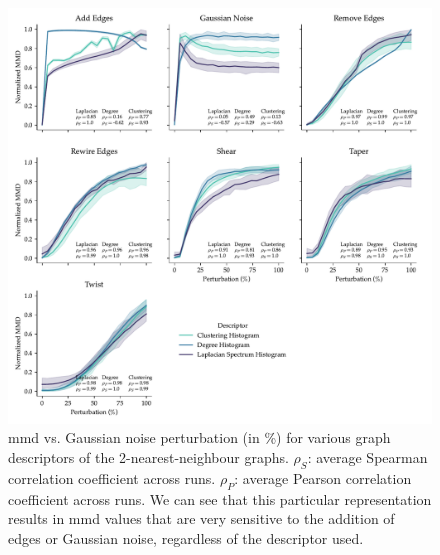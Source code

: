 \begin{figure}[!htbp]
  \centering
  \includegraphics[width=\textwidth]{./figures/results/res_1_3.pdf}
  \caption[2-nearest-neighbour graphs result in descriptors highly sensitive to
the addition of edges and Gaussian noise.]{\acrshort{mmd} vs. Gaussian noise perturbation
(in \%) for various graph descriptors of the 2-nearest-neighbour graphs.
$\rho_{S}$: average Spearman correlation coefficient across runs. $\rho_{P}$:
average Pearson correlation coefficient across runs. We can see that this
particular representation results in \acrshort{mmd} values that are very sensitive to the
addition of edges or Gaussian noise, regardless of the descriptor used.}
  \label{fig:mmd_k_nn_graphs}
\end{figure}

